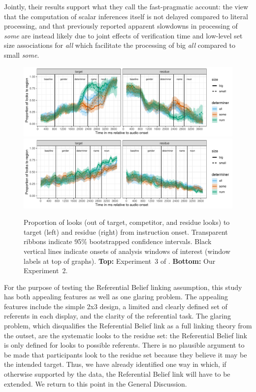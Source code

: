 \documentclass[10pt,letterpaper]{article}
\newcommand{\expref}[1]{Experiment~#1}
\begin{document}
Jointly, their results support what they call the fast-pragmatic account: the view that the computation of scalar inferences itself is not delayed compared to literal processing, and that previously reported apparent slowdowns in processing of \emph{some} are instead likely due to joint effects of verification time and low-level set size associations for \emph{all} which facilitate the processing of big \emph{all} compared to small \emph{some}. 


\begin{figure}
\centering
\includegraphics[width=\textwidth]{../../analysis/SunBreheny/1_incremental/main/graphs/proportions_condsize_withresidue_tr.pdf}
\includegraphics[width=\textwidth]{../../analysis/SunBreheny/2_webgazer/main/graphs/proportions_condsize_withresidue_tr.pdf}
\caption{Proportion of looks (out of target, competitor, and residue looks) to target (left) and residue (right) from instruction onset. Transparent ribbons indicate 95\% bootstrapped confidence intervals. Black vertical lines indicate onsets of analysis windows of interest (window labels at top of graphs). \textbf{Top:} \expref{3} of . \textbf{Bottom:} Our \expref{2}.}
\label{fig:results-original}
\end{figure}

For the purpose of testing the Referential Belief linking assumption, this study has both appealing features as well as one glaring problem. The appealing features include the simple 2x3 design, a limited and clearly defined set of referents in each display, and the clarity of the referential task. The glaring problem, which disqualifies the Referential Belief link as a full linking theory from the outset, are the systematic looks to the residue set: the Referential Belief link is only defined for looks to possible referents. There is no plausible argument to be made that participants look to the residue set because they believe it may be the intended target.  Thus, we have already identified one way in which, if otherwise supported by the data, the Referential Belief link will have to be extended. We return to this point in the General Discussion.
\end{document}

